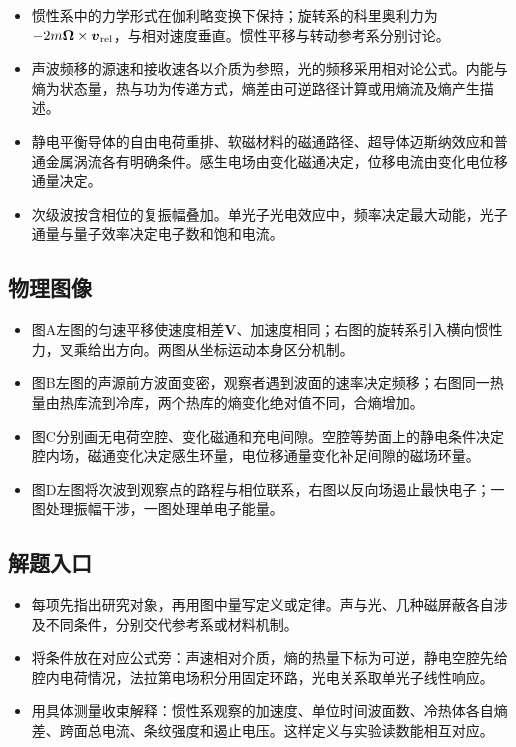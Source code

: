 \documentclass[UTF8,fontset=fandol,a4paper,11pt]{ctexart}
\begin{document}
\begin{itemize}
\item 惯性系中的力学形式在伽利略变换下保持；旋转系的科里奥利力为$-2m\boldsymbol\Omega\times\boldsymbol v_{\rm rel}$，与相对速度垂直。惯性平移与转动参考系分别讨论。
\item 声波频移的源速和接收速各以介质为参照，光的频移采用相对论公式。内能与熵为状态量，热与功为传递方式，熵差由可逆路径计算或用熵流及熵产生描述。
\item 静电平衡导体的自由电荷重排、软磁材料的磁通路径、超导体迈斯纳效应和普通金属涡流各有明确条件。感生电场由变化磁通决定，位移电流由变化电位移通量决定。
\item 次级波按含相位的复振幅叠加。单光子光电效应中，频率决定最大动能，光子通量与量子效率决定电子数和饱和电流。
\end{itemize}



\subsection*{物理图像}

\begin{itemize}
\item 图A左图的匀速平移使速度相差$\boldsymbol V$、加速度相同；右图的旋转系引入横向惯性力，叉乘给出方向。两图从坐标运动本身区分机制。
\item 图B左图的声源前方波面变密，观察者遇到波面的速率决定频移；右图同一热量由热库流到冷库，两个热库的熵变化绝对值不同，合熵增加。
\item 图C分别画无电荷空腔、变化磁通和充电间隙。空腔等势面上的静电条件决定腔内场，磁通变化决定感生环量，电位移通量变化补足间隙的磁场环量。
\item 图D左图将次波到观察点的路程与相位联系，右图以反向场遏止最快电子；一图处理振幅干涉，一图处理单电子能量。
\end{itemize}



\subsection*{解题入口}

\begin{itemize}
\item 每项先指出研究对象，再用图中量写定义或定律。声与光、几种磁屏蔽各自涉及不同条件，分别交代参考系或材料机制。
\item 将条件放在对应公式旁：声速相对介质，熵的热量下标为可逆，静电空腔先给腔内电荷情况，法拉第电场积分用固定环路，光电关系取单光子线性响应。
\item 用具体测量收束解释：惯性系观察的加速度、单位时间波面数、冷热体各自熵差、跨面总电流、条纹强度和遏止电压。这样定义与实验读数能相互对应。
\end{itemize}
\end{document}
